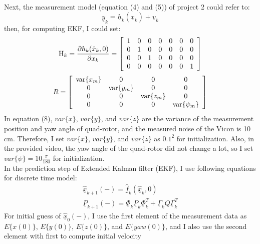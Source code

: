 \documentclass[10pt,letterpaper]{article}
\begin{document}
Next, the measurement model (equation (4) and (5)) of project 2 could refer to: 
\begin{equation}
	\underline{y}_k=\underline{h}_k(\underline{x}_k)+\underline{v}_k
\end{equation}
then, for computing EKF, I could set:
\begin{equation}
	{\rm H}_k  = \frac{{\partial h_k (\hat x_k ,0)}}{{\partial x_k }} = \left[ {\begin{array}{*{20}c}
	   1 & 0 & 0 & 0 & 0 & 0 & 0  \\
	   0 & 1 & 0 & 0 & 0 & 0 & 0  \\
	   0 & 0 & 1 & 0 & 0 & 0 & 0  \\
	   0 & 0 & 0 & 0 & 0 & 0 & 1  \\
	\end{array}} \right]
\end{equation}
\begin{equation}
	R = \left[ {\begin{array}{*{20}c}
	   {{\mathop{\rm var}} \{ x_m \} } & 0 & 0 & 0  \\
	   0 & {{\mathop{\rm var}} \{ y_m \} } & 0 & 0  \\
	   0 & 0 & {{\mathop{\rm var}} \{ z_m \} } & 0  \\
	   0 & 0 & 0 & {{\mathop{\rm var}} \{ \psi _m \} }  \\
	\end{array}} \right]
\end{equation}
In equation (8), $var\{x\}$, $var\{y\}$, and $var\{z\}$ are the variance of the measurement position and yaw 
angle of quad-rotor, and the measured noise of the Vicon is 10 cm. Therefore, I set $var\{x\}$, $var\{y\}$, and 
$var\{z\}$ as $0.1^2$ for initialization. Also, in the provided video, the yaw angle of the quad-rotor did not 
change a lot, so I set $var\{\psi\}=10\frac{\pi}{180}$ for initialization.\\
In the prediction step of Extended Kalman filter (EKF), I use following equations for discrete time model:
\begin{eqnarray}
	\underline{\hat{x}}_{k + 1}(-)  = \underline{\hat{f}}_k (\underline{\hat{x}}_k ,0)\\
	\underline{P}_{k + 1} ( - ) = \underline{\Phi}_k \underline{P}_k \underline{\Phi}_k^T + \underline{\Gamma}_k Q \underline{\Gamma}_k^T 
\end{eqnarray}
For initial guess of $\underline{\hat{x}}_0(-)$, I use the first element of the measurement data as $E\{x(0)\}$, 
$E\{y(0)\}$, $E\{z(0)\}$, and $E\{yaw(0)\}$, and I also use the second element with first to compute initial velocity 
\end{document}
